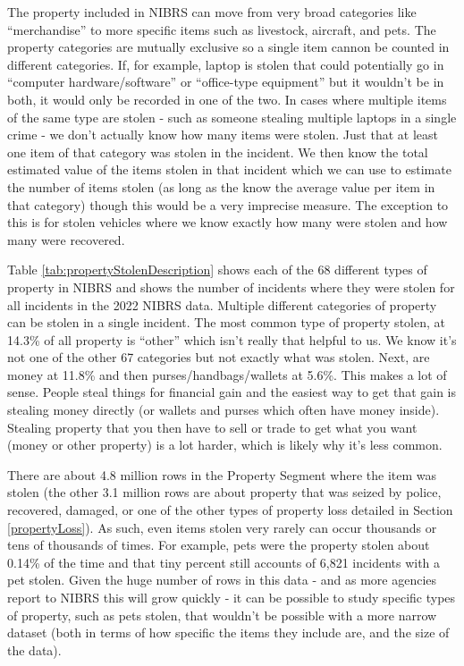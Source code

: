 \documentclass[
  12pt,
  openany]{book}
\begin{document}
The property included in NIBRS can move from very broad categories like ``merchandise'' to more specific items such as livestock, aircraft, and pets. The property categories are mutually exclusive so a single item cannon be counted in different categories. If, for example, laptop is stolen that could potentially go in ``computer hardware/software'' or ``office-type equipment'' but it wouldn't be in both, it would only be recorded in one of the two. In cases where multiple items of the same type are stolen - such as someone stealing multiple laptops in a single crime - we don't actually know how many items were stolen. Just that at least one item of that category was stolen in the incident. We then know the total estimated value of the items stolen in that incident which we can use to estimate the number of items stolen (as long as the know the average value per item in that category) though this would be a very imprecise measure. The exception to this is for stolen vehicles where we know exactly how many were stolen and how many were recovered.

Table \ref{tab:propertyStolenDescription} shows each of the 68 different types of property in NIBRS and shows the number of incidents where they were stolen for all incidents in the 2022 NIBRS data. Multiple different categories of property can be stolen in a single incident. The most common type of property stolen, at 14.3\% of all property is ``other'' which isn't really that helpful to us. We know it's not one of the other 67 categories but not exactly what was stolen. Next, are money at 11.8\% and then purses/handbags/wallets at 5.6\%. This makes a lot of sense. People steal things for financial gain and the easiest way to get that gain is stealing money directly (or wallets and purses which often have money inside). Stealing property that you then have to sell or trade to get what you want (money or other property) is a lot harder, which is likely why it's less common.

There are about 4.8 million rows in the Property Segment where the item was stolen (the other 3.1 million rows are about property that was seized by police, recovered, damaged, or one of the other types of property loss detailed in Section \ref{propertyLoss}). As such, even items stolen very rarely can occur thousands or tens of thousands of times. For example, pets were the property stolen about 0.14\% of the time and that tiny percent still accounts of 6,821 incidents with a pet stolen. Given the huge number of rows in this data - and as more agencies report to NIBRS this will grow quickly - it can be possible to study specific types of property, such as pets stolen, that wouldn't be possible with a more narrow dataset (both in terms of how specific the items they include are, and the size of the data).
\end{document}
